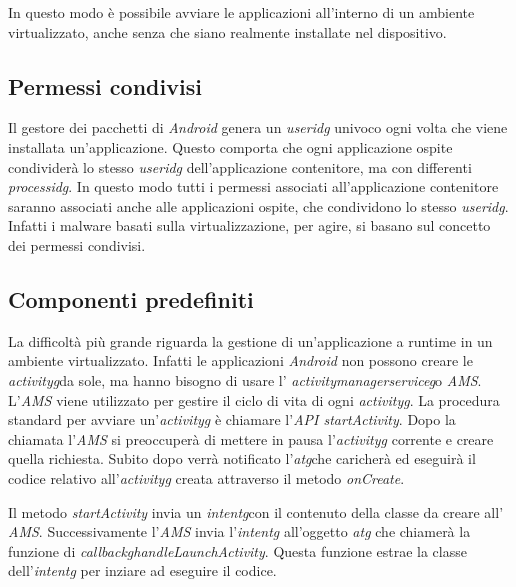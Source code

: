 In questo modo è possibile avviare le applicazioni all'interno di un ambiente virtualizzato, anche senza che siano realmente installate nel dispositivo.

\newpage

\subsection*{Permessi condivisi}

Il gestore dei pacchetti di \emph{Android} genera un \emph{\gls{useridg}} univoco ogni volta che viene installata un'applicazione. Questo comporta che ogni applicazione ospite condividerà lo stesso \emph{\gls{useridg}} dell'applicazione contenitore, ma con differenti \emph{\gls{processidg}}. In questo modo tutti i permessi associati all'applicazione contenitore saranno associati anche alle applicazioni ospite, che condividono lo stesso \emph{\gls{useridg}}. Infatti i malware basati sulla virtualizzazione, per agire, si basano sul concetto dei permessi condivisi.


\subsection*{Componenti predefiniti}

La difficoltà più grande riguarda la gestione di un'applicazione a runtime in un ambiente virtualizzato.
Infatti le applicazioni \emph{Android} non possono creare le \emph{\gls{activityg}}\glsfirstoccurspace da sole, ma hanno bisogno di usare l' \emph{\gls{activitymanagerserviceg}}\glsfirstoccurspace o \emph{AMS}. L'\emph{AMS} viene utilizzato per gestire il ciclo di vita di ogni \emph{\gls{activityg}}. La procedura standard per avviare un'\emph{\gls{activityg}} è chiamare l'\emph{API startActivity}. Dopo la chiamata l'\emph{AMS} si preoccuperà di mettere in pausa l'\emph{\gls{activityg}} corrente e creare quella richiesta. Subito dopo verrà notificato l'\emph{\gls{atg}}\glsfirstoccurspace che caricherà ed eseguirà il codice relativo all'\emph{\gls{activityg}} creata attraverso il metodo \emph{onCreate}.

Il metodo \emph{startActivity} invia un \emph{\gls{intentg}}\glsfirstoccurspace con il contenuto della classe da creare all' \emph{AMS}. Successivamente l'\emph{AMS} invia l'\emph{\gls{intentg}} all'oggetto \emph{\gls{atg}} che chiamerà la funzione di \emph{\gls{callbackg}}\glsfirstoccurspace \emph{handleLaunchActivity}. Questa funzione estrae la classe dell'\emph{\gls{intentg}} per inziare ad eseguire il codice.

